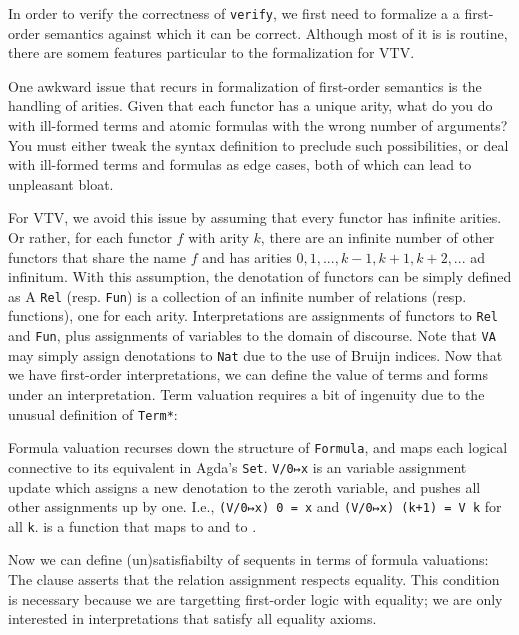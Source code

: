 \documentclass[12pt]{article}
\begin{document}
In order to verify the correctness of \verb|verify|, we first need to formalize a 
a first-order semantics against which it can be correct. Although most of it is 
is routine, there are somem features particular to the formalization for VTV.

One awkward issue that recurs in formalization of first-order semantics is the 
handling of arities. Given that each functor has a unique arity,
what do you do with ill-formed terms and atomic formulas with the wrong 
number of arguments? You must either tweak the syntax definition to 
preclude such possibilities, or deal with ill-formed terms and formulas as 
edge cases, both of which can lead to unpleasant bloat. 

For VTV, we avoid this issue by assuming that every functor has infinite arities.
Or rather, for each functor $f$ with arity $k$, there are an infinite number 
of other functors that share the name $f$ and has arities $0, 1, ..., k-1, k+1, k+2, ...$ 
ad infinitum. With this assumption, the denotation of functors can be 
simply defined as 
A \verb|Rel| (resp. \verb|Fun|) is a collection of an infinite number of 
relations (resp. functions), one for each arity. Interpretations are  
assignments of functors to \verb|Rel| and \verb|Fun|, plus assignments of
variables to the domain of discourse. Note that \verb|VA| may simply assign 
denotations to \verb|Nat| due to the use of Bruijn indices. 
Now that we have first-order interpretations, we can define the value 
of terms and forms under an interpretation. Term valuation requires a bit of
ingenuity due to the unusual definition of \verb|Term*|:


Formula valuation recurses down the structure of \verb|Formula|, and maps 
each logical connective to its equivalent in Agda's \verb|Set|.
\verb|V/0↦x| is an variable assignment update which assigns a new denotation 
to the zeroth variable, and pushes all other assignments up by one. I.e.,
\verb|(V/0↦x) 0 = x| and \verb|(V/0↦x) (k+1) = V k| for all \verb|k|. 
 is a function that maps 
to  and  to .

Now we can define (un)satisfiabilty of sequents in terms of formula valuations: 
The \AgdaSpace{} clause asserts that the
relation assignment  respects equality. This condition is necessary
because we are targetting first-order logic with equality; we are only 
interested in interpretations that satisfy all equality axioms.
\end{document}
